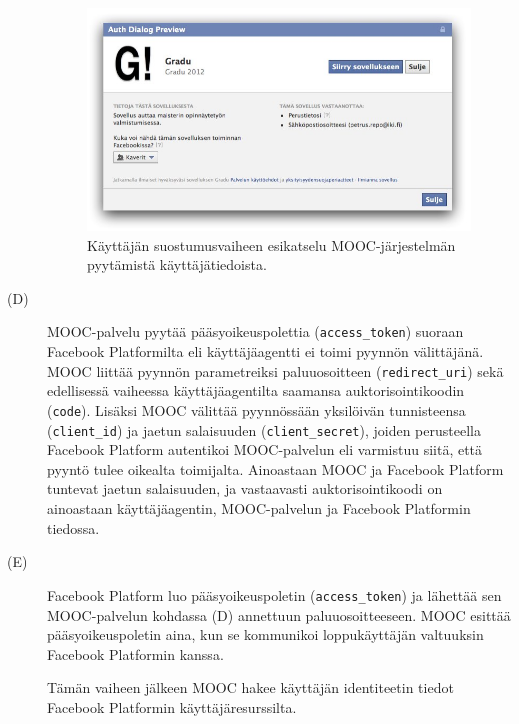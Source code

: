 \documentclass[finnish,gradu]{tktltiki}
\begin{document}
\begin{description}

  \begin{figure}
    \centering
    \includegraphics[width=1.0\textwidth]{images/facebook_auth_dialog.jpg}
    \caption{Käyttäjän suostumusvaiheen esikatselu MOOC-järjestelmän pyytämistä käyttäjätiedoista.}
    \label{fig:facebook_auth_dialog}
  \end{figure}


  \item[(D)]
    MOOC-palvelu pyytää pääsyoikeuspolettia (\verb!access_token!) suoraan Facebook Platformilta eli käyttäjäagentti ei toimi pyynnön välittäjänä. MOOC liittää pyynnön parametreiksi paluuosoitteen (\verb!redirect_uri!) sekä edellisessä vaiheessa käyttäjäagentilta saamansa auktorisointikoodin (\verb!code!). Lisäksi MOOC välittää pyynnössään yksilöivän tunnisteensa (\verb!client_id!) ja jaetun salaisuuden (\verb!client_secret!), joiden perusteella Facebook Platform autentikoi MOOC-palvelun eli varmistuu siitä, että pyyntö tulee oikealta toimijalta. Ainoastaan MOOC ja Facebook Platform tuntevat jaetun salaisuuden, ja vastaavasti auktorisointikoodi on ainoastaan käyttäjäagentin, MOOC-palvelun ja Facebook Platformin tiedossa.



  \item[(E)]
  Facebook Platform luo pääsyoikeuspoletin (\verb!access_token!) ja lähettää sen MOOC-palvelun kohdassa (D) annettuun paluuosoitteeseen. MOOC esittää pääsyoikeuspoletin aina, kun se kommunikoi loppukäyttäjän valtuuksin Facebook Platformin kanssa.

  Tämän vaiheen jälkeen MOOC hakee käyttäjän identiteetin tiedot Facebook Platformin käyttäjäresurssilta.

  \end{description}
\end{document}
